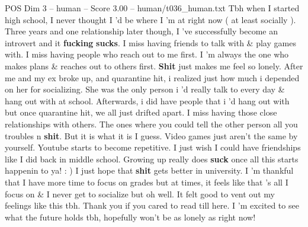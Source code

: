 \begin{textsample}{POS Dim 3 – human – Score 3.00 – human/t036\_human.txt}  \label{ex:f3_pos_009}
Tbh when I started high school, I never thought I ’d be where I ’m at right now ( at least socially ).
Three years and one relationship later though, I ’ve successfully become an introvert and it \textbf{fucking} \textbf{sucks}.
I miss having friends to talk with \& play games with.
I miss having people who reach out to me first.
I ’m always the one who makes plans \& reaches out to others first. \textbf{Shit} just makes me feel so lonely.
After me and my ex broke up, and quarantine hit, i realized just how much i depended on her for socializing.
She was the only person i ’d really talk to every day \& hang out with at school.
Afterwards, i did have people that i ’d hang out with but once quarantine hit, we all just drifted apart.
I miss having those close relationships with others.
The ones where you could tell the other person all you troubles n \textbf{shit}.
But it is what it is I guess.
Video games just aren't the same by yourself.
Youtube starts to become repetitive.
I just wish I could have friendships like I did back in middle school.
Growing up really does \textbf{suck} once all this starts happenin to ya! : ) I just hope that \textbf{shit} gets better in university.
I ’m thankful that I have more time to focus on grades but at times, it feels like that ’s all I focus on \& I never get to socialize but oh well.
It felt good to vent out my feelings like this tbh.
Thank you if you cared to read till here.
I ’m excited to see what the future holds tbh, hopefully won't be as lonely as right now!

\end{textsample}
